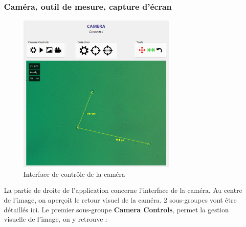 \subsubsection{Caméra, outil de mesure, capture d'écran}

\begin{figure}[H]
    \centering
    \includegraphics[width=0.7\textwidth]{assets/figures/Application_ServoVision/Measure_Tool.png}
    \caption{Interface de contrôle de la caméra}
    \label{Measure_Tool}
\end{figure}
La partie de droite de l'application concerne l'interface de la caméra. Au centre de l'image, on aperçoit le retour visuel de la caméra. 2 sous-groupes vont être détaillés ici.
\newpage
Le premier sous-groupe \textbf{Camera Controls}, permet la gestion visuelle de l'image, on y retrouve :
